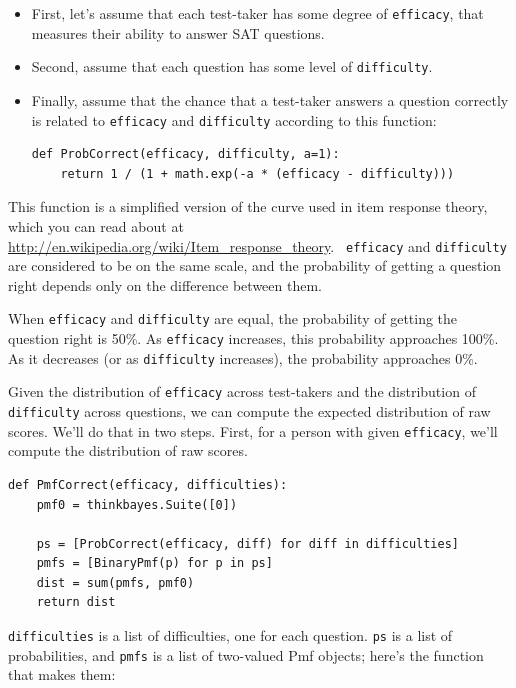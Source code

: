 \documentclass[12pt]{book}
\begin{document}
\begin{itemize}

\item First, let's assume that each test-taker has some 
  degree of {\tt efficacy}, that measures their
  ability to answer SAT questions.

\item Second, assume that each question has some level of
  {\tt difficulty}.

\item Finally, assume that the chance that a test-taker answers a
  question correctly is related to {\tt efficacy} and {\tt difficulty}
  according to this function:

\begin{verbatim}
def ProbCorrect(efficacy, difficulty, a=1):
    return 1 / (1 + math.exp(-a * (efficacy - difficulty)))
\end{verbatim}

\end{itemize}

This function is a simplified version of the curve used in item
response theory, which you can read about at
\url{http://en.wikipedia.org/wiki/Item_response_theory}.  {\tt
  efficacy} and {\tt difficulty} are considered to be on the same
scale, and the probability of getting a question right depends only on
the difference between them.

When {\tt efficacy} and {\tt difficulty} are equal, the
probability of getting the question right is 50\%.  As
{\tt efficacy} increases, this probability approaches 100\%.
As it decreases (or as {\tt difficulty} increases), the
probability approaches 0\%.

Given the distribution of {\tt efficacy} across test-takers
and the distribution of {\tt difficulty} across questions, we
can compute the expected distribution of raw scores.  We'll do that
in two steps.  First, for a person with given {\tt efficacy},
we'll compute the distribution of raw scores.

\begin{verbatim}
def PmfCorrect(efficacy, difficulties):
    pmf0 = thinkbayes.Suite([0])

    ps = [ProbCorrect(efficacy, diff) for diff in difficulties]
    pmfs = [BinaryPmf(p) for p in ps]
    dist = sum(pmfs, pmf0)
    return dist
\end{verbatim}

{\tt difficulties} is a list of difficulties, one for each question.
{\tt ps} is a list of probabilities, and {\tt pmfs} is a list of
two-valued Pmf objects; here's the function that makes them:
\end{document}
